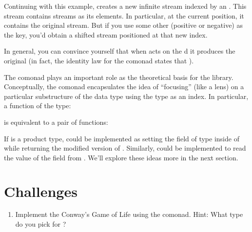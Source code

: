 Continuing with this example,  creates a new infinite
stream indexed by an . This stream contains streams as its
elements. In particular, at the current position, it contains the
original stream. But if you use some other  (positive or
negative) as the key, you'd obtain a shifted stream positioned at that
new index.

In general, you can convince yourself that when  acts on
the d  it produces the original
 (in fact, the identity law for the comonad states that
).

The  comonad plays an important role as the theoretical
basis for the  library. Conceptually, the
 comonad encapsulates the idea of ``focusing'' (like
a lens) on a particular substructure of the data type  using
the type  as an index. In particular, a function of the type:

is equivalent to a pair of functions:

If  is a product type,  could be implemented as
setting the field of type  inside of  while
returning the modified version of . Similarly, 
could be implemented to read the value of the  field from
. We'll explore these ideas more in the next section.

\section{Challenges}

\begin{enumerate}
	\tightlist
	\item
	      Implement the Conway's Game of Life using the  comonad.
	      Hint: What type do you pick for ?
\end{enumerate}
